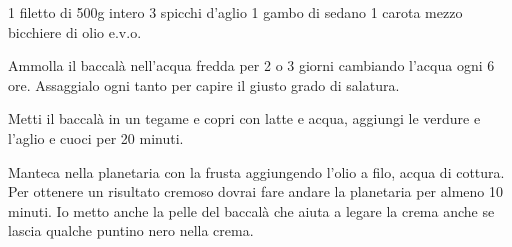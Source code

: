 \begin{ingreds}
	1 filetto di 
	500g  intero
	3 spicchi d'aglio
	1 gambo di sedano
	1 carota
	mezzo bicchiere di olio e.v.o.


\end{ingreds}

\begin{method}
Ammolla il baccalà nell'acqua fredda per 2 o 3 giorni cambiando l'acqua ogni 6 ore. Assaggialo ogni tanto per capire il giusto grado di salatura.

Metti il baccalà in un tegame e copri con latte e acqua, aggiungi le verdure e l'aglio e cuoci per 20 minuti.

Manteca nella planetaria con la frusta aggiungendo l'olio a filo, acqua di cottura. Per ottenere un risultato cremoso dovrai fare andare la planetaria per almeno 10 minuti. Io metto anche la pelle del baccalà che aiuta a legare la crema anche se lascia qualche puntino nero nella crema.



\end{method}



